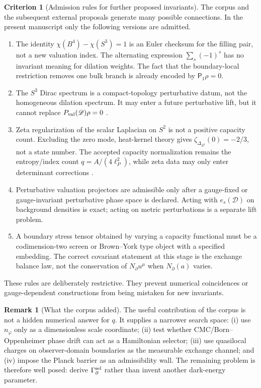 \documentclass[aps,prd,reprint,nofootinbib,superscriptaddress,floatfix]{revtex4-2}
\numberwithin{equation}{section}
\theoremstyle{definition}
\newtheorem{criterion}{Criterion}[section]
\newtheorem{remark}{Remark}[section]
\theoremstyle{plain}
\begin{document}
\begin{criterion}[Admission rules for further proposed invariants]\label{crit:admission-rules}
The corpus and the subsequent external proposals generate many possible
connections.  In the present manuscript only the following versions are
admitted.
\begin{enumerate}
\item The identity \(\chi(B^4)-\chi(S^3)=1\) is an Euler checksum for the
filling pair, not a new valuation index.  The alternating expression
\(\sum_s(-1)^s\) has no invariant meaning for dilation weights.  The fact that
the boundary-local restriction removes one bulk branch is already encoded by
\(\mathsf P_1\rho=0\).
\item The \(S^3\) Dirac spectrum is a compact-topology perturbative datum,
not the homogeneous dilation spectrum.  It may enter a future perturbative
lift, but it cannot replace \(P_{\rm val}(\mathscr D)\rho=0\)
\cite{Baer1996}.
\item Zeta regularization of the scalar Laplacian on \(S^2\) is not a positive
capacity count.  Excluding the zero mode, heat-kernel theory gives
\(\zeta_{\Delta_{S^2}}(0)=-2/3\), not a state number.  The accepted capacity
normalization remains the entropy/index count
\(q=A/(4\ell_P^2)\), while zeta data may only enter determinant corrections
\cite{Vassilevich2003}.
\item Perturbative valuation projectors are admissible only after a gauge-fixed
or gauge-invariant perturbative phase space is declared.  Acting with
\(e_s(\mathscr D)\) on background densities is exact; acting on metric
perturbations is a separate lift problem.
\item A boundary stress tensor obtained by varying a capacity functional must be
a codimension-two screen or Brown--York type object with a specified embedding.
The correct covariant statement at this stage is the exchange balance law,
not the conservation of \(N_\partial u^\mu\) when \(N_\partial(a)\) varies.
\end{enumerate}
These rules are deliberately restrictive.  They prevent numerical coincidences
or gauge-dependent constructions from being mistaken for new invariants.
\end{criterion}

\begin{remark}[What the corpus added]
The useful contribution of the corpus is not a hidden numerical answer for
\(q\).  It supplies a narrower search space: (i) use \(n_\varphi\) only as a
dimensionless scale coordinate; (ii) test whether CMC/Born--Oppenheimer phase
drift can act as a Hamiltonian selector; (iii) use quasilocal charges on
observer-domain boundaries as the measurable exchange channel; and (iv) impose
the Planck barrier as an admissibility wall.  The remaining problem is therefore
well posed: derive \(\Gamma_\partial^{\rm sel}\) rather than invent another
dark-energy parameter.
\end{remark}
\end{document}
